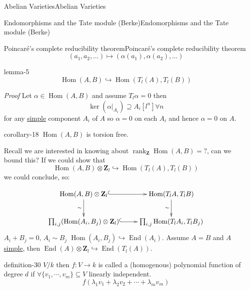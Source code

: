 \documentclass[10pt,]{book}
\makeatletter
\renewcommand*{\proofname}{Proof}
\renewenvironment{proof}[1][\proofname]{\par
  \pushQED{\qed}%
  \normalfont \topsep6\p@\@plus6\p@\relax
  \trivlist
  \item\relax
    {\itshape
    #1\@addpunct{.}}\hspace\labelsep\ignorespaces
}{%
  \popQED\endtrivlist\@endpefalse
}
\numberwithin{equation}{section}
\newcommand{\ZZ}{\mathbf{Z}}
\DeclareMathOperator{\End}{End}
\DeclareMathOperator{\Hom}{Hom}
\DeclareMathOperator{\rank}{rank}
\makeatother
\begin{document}
\begin{chapterptx}{Abelian Varieties}{}{Abelian Varieties}{}{}
\begin{sectionptx}{Endomorphisms and the Tate module (Berke)}{}{Endomorphisms and the Tate module (Berke)}{}{}
\begin{subsectionptx}{Poincaré's complete reducibility theorem}{}{Poincaré's complete reducibility theorem}{}{}
%
\begin{equation*}
(a_1,a_2, \ldots) \mapsto(\alpha(a_1),\alpha(a_2), \ldots)
\end{equation*}
%
\begin{lemma}{}{}{lemma-5}%
\hypertarget{p-229}{}%
%
\begin{equation*}
\Hom(A,B) \hookrightarrow \Hom(T_l(A), T_l(B))
\end{equation*}
%
\end{lemma}
\begin{proof}\hypertarget{proof-43}{}
\hypertarget{p-230}{}%
Let \(\alpha \in \Hom(A,B)\) and assume \(T_l \alpha = 0\) then%
\begin{equation*}
\ker (\alpha|_{A_i}) \supseteq A_i[l^n] \forall n
\end{equation*}
for any \hyperref[def-simple-av]{simple} component \(A_i\) of \(A\) so \(\alpha =0\) on each \(A_i\) and hence \(\alpha = 0\) on \(A\).%
\end{proof}
\begin{corollary}{}{}{corollary-18}%
\hypertarget{p-231}{}%
\(\Hom(A,B)\) is torsion free.%
\end{corollary}
\hypertarget{p-232}{}%
Recall we are interested in knowing about \(\rank_\ZZ\Hom(A,B) = ?\), can we bound this? If we could show that%
\begin{equation*}
\Hom(A,B) \otimes \ZZ_l \hookrightarrow \Hom(T_l(A),T_l(B))
\end{equation*}
we could conclude, so:%
\par
\hypertarget{p-233}{}%
%
\begin{equation*}
\xymatrix{
\Hom(A,B)\otimes \ZZ_l \ar[d]_{\sim} \ar@{^(->}[r]     & \Hom(T_lA,T_lB)\ar[d]_{\sim} \\
\prod_{i,j} (\Hom(A_i, B_j) \otimes \ZZ_l) \ar@{^(->}[r] & \prod_{i,j}\Hom(T_lA_i, T_l B_j)
}
\end{equation*}
\(A_i + B_j = 0\), \(A_i\sim B_j\) \(\Hom(A_i, B_j) \hookrightarrow \End(A_i)\). Assume \(A= B\) and \(A\) \hyperref[def-simple-av]{simple}, then \(\End(A) \otimes \ZZ_l \hookrightarrow \End(T_l(A))\).%
\begin{definition}{}{definition-30}%
\hypertarget{p-234}{}%
\(V/k\) then \(f\colon V \to k\) is called a (homogenous) polynomial function of degree \(d\) if \(\forall \{v_1,\cdots, v_m\}\subseteq V\) linearly independent.%
\begin{equation*}
f(\lambda_1 v_1 + \lambda_2 v_2 +\cdots + \lambda_m v_m)
\end{equation*}

\end{definition}
\end{subsectionptx}
\end{sectionptx}
\end{chapterptx}
\end{document}
